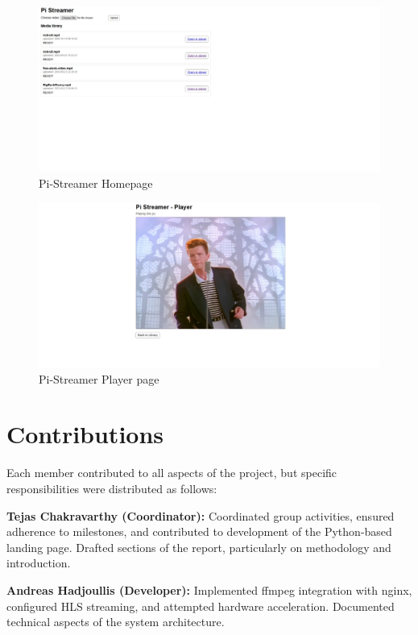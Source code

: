 \documentclass[11pt]{article}
\begin{document}
\begin{figure}[H]
    \centering
    \includegraphics[width=2\linewidth]{pi-streamer-homepage.png}
    \caption{Pi-Streamer Homepage}
    \label{fig:pi-streamer-homepage}
\end{figure}
\begin{figure}[H]
    \centering
    \hspace*{-6cm}                                                           
    \includegraphics[width=2\linewidth,]{pi-streamer-playerpage.png}
    \caption{Pi-Streamer Player page}
    \label{fig:pi-streamer-playerpage}
\end{figure}
\newpage
\section{Contributions}
Each member contributed to all aspects of the project, but specific responsibilities were distributed as follows:

\textbf{Tejas Chakravarthy (Coordinator):} Coordinated group activities, ensured adherence to milestones, and contributed to development of the Python-based landing page. Drafted sections of the report, particularly on methodology and introduction.


\textbf{Andreas Hadjoullis (Developer):} Implemented ffmpeg integration with nginx, configured HLS streaming, and attempted hardware acceleration. Documented technical aspects of the system architecture.
\end{document}
